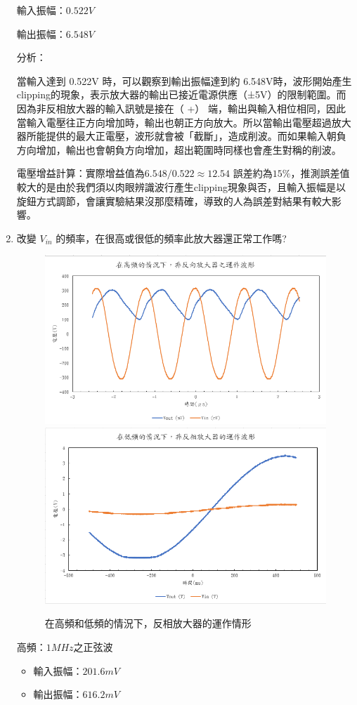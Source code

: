\documentclass[12pt,a4paper]{article}
\begin{document}
\begin{CJK}{UTF8}{bkai}
\begin{enumerate}
輸入振幅：$0.522V$

輸出振幅：$6.548V$

\noindent 分析：

當輸入達到 0.522V 時，可以觀察到輸出振幅達到約 6.548V時，波形開始產生clipping的現象，表示放大器的輸出已接近電源供應（±5V）的限制範圍。而因為非反相放大器的輸入訊號是接在（ +） 端，輸出與輸入相位相同，因此當輸入電壓往正方向增加時，輸出也朝正方向放大。所以當輸出電壓超過放大器所能提供的最大正電壓，波形就會被「截斷」，造成削波。而如果輸入朝負方向增加，輸出也會朝負方向增加，超出範圍時同樣也會產生對稱的削波。

\noindent 電壓增益計算：實際增益值為$6.548/0.522\approx12.54$
誤差約為$15\%$，推測誤差值較大的是由於我們須以肉眼辨識波行產生clipping現象與否，且輸入振幅是以旋鈕方式調節，會讓實驗結果沒那麼精確，導致的人為誤差對結果有較大影響。







\item 改變 $V_{in}$ 的頻率，在很高或很低的頻率此放大器還正常工作嗎?
\begin{figure}[h]
    \centering
    \includegraphics[width=0.45\linewidth]{figures/non-ia/non-inverting amplifier_high freq.png}
    \includegraphics[width=0.45\linewidth]{figures/non-ia/non-inverting amplifier_low freq.png}
    \caption{在高頻和低頻的情況下，反相放大器的運作情形}
    \label{fig:non_IA_freq}
\end{figure}
\clearpage
高頻：$1MHz$之正弦波
\begin{itemize}
    \item 輸入振幅：$201.6mV$
    \item 輸出振幅：$616.2mV$
\end{itemize}


\end{enumerate}
\end{CJK}
\end{document}
